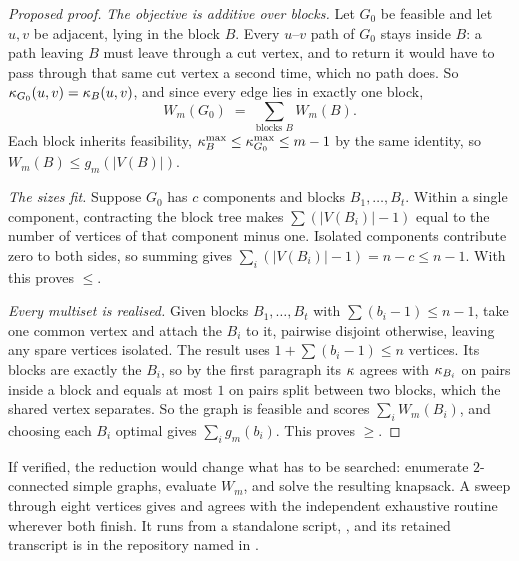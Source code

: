 \begin{proof}[Proposed proof]
\emph{The objective is additive over blocks.} Let $G_0$ be feasible and let $u,v$ be adjacent, lying in the block $B$. Every $u$--$v$ path of $G_0$ stays inside $B$: a path leaving $B$ must leave through a cut vertex, and to return it would have to pass through that same cut vertex a second time, which no path does. So $\kappa_{G_0}(u,v) = \kappa_B(u,v)$, and since every edge lies in exactly one block,
\[
    W_m(G_0) \;=\; \sum_{\text{blocks } B} W_m(B) .
\]
Each block inherits feasibility, $\kappa^{\max}_B \le \kappa^{\max}_{G_0} \le m-1$ by the same identity, so $W_m(B) \le g_m(|V(B)|)$.

\emph{The sizes fit.} Suppose $G_0$ has $c$ components and blocks $B_1, \dots, B_t$. Within a single component, contracting the block tree makes $\sum (|V(B_i)|-1)$ equal to the number of vertices of that component minus one. Isolated components contribute zero to both sides, so summing gives $\sum_i (|V(B_i)| - 1) = n-c \le n-1$. With  this proves $\le$.

\emph{Every multiset is realised.} Given blocks $B_1, \dots, B_t$ with $\sum (b_i - 1) \le n-1$, take one common vertex and attach the $B_i$ to it, pairwise disjoint otherwise, leaving any spare vertices isolated. The result uses $1 + \sum (b_i-1) \le n$ vertices. Its blocks are exactly the $B_i$, so by the first paragraph its $\kappa$ agrees with $\kappa_{B_i}$ on pairs inside a block and equals at most $1$ on pairs split between two blocks, which the shared vertex separates. So the graph is feasible and scores $\sum_i W_m(B_i)$, and choosing each $B_i$ optimal gives $\sum_i g_m(b_i)$. This proves $\ge$.
\end{proof}

If verified, the reduction would change what has to be searched: enumerate $2$-connected simple
graphs, evaluate $W_m$, and solve the resulting knapsack. A sweep through eight
vertices gives  and agrees with the independent
exhaustive routine wherever both finish. It runs from a standalone script,
, and its retained
transcript is  in the repository named
in .


